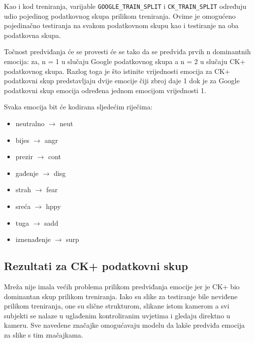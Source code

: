 \documentclass[times, utf8, zavrsni,numeric,pstricks]{fer}
\begin{document}
Kao i kod treniranja, varijable \lstinline"GOOGLE_TRAIN_SPLIT" i \lstinline"CK_TRAIN_SPLIT" određuju udio pojedinog podatkovnog skupa prilikom treniranja. Ovime je omogućeno pojedinačno testiranja na svakom podatkovnom skupu kao i testiranje na oba podatkovna skupa.

Točnost predviđanja će se provesti će se tako da se predviđa prvih n dominantnih emocija:
za, n = 1 u slučaju Google podatkovnog skupa a n = 2 u slučaju CK+ podatkovnog skupa. Razlog toga je što istinite vrijednosti emocija za CK+ podatkovni skup predstavljaju dvije emocije čiji zbroj daje 1 dok je za Google podatkovni skup emocija određena jednom emocijom vrijednosti 1.

Svaka emocija bit će kodirana sljedećim riječima:
\begin{itemize}
\item{neutralno $\rightarrow$ neut}
\item{bijes $\rightarrow$ angr}
\item{prezir $\rightarrow$ cont}
\item{gađenje $\rightarrow$ disg}
\item{strah $\rightarrow$ fear}
\item{sreća $\rightarrow$ hppy}
\item{tuga $\rightarrow$ sadd}
\item{iznenađenje $\rightarrow$ surp}


\end{itemize}
\subsection{Rezultati za CK+ podatkovni skup}

Mreža nije imala većih problema prilikom predviđanja emocije jer je CK+ bio dominantan skup prilikom treniranja. Iako su slike za testiranje bile neviđene prilikom treniranja, one su slične strukturom, slikane istom kamerom a svi subjekti se nalaze u uglađenim kontroliranim uvjetima i gledaju direktno u kameru. Sve navedene značajke omogućavaju modelu da lakše predviđa emocija za slike s tim značajkama. 
\end{document}
